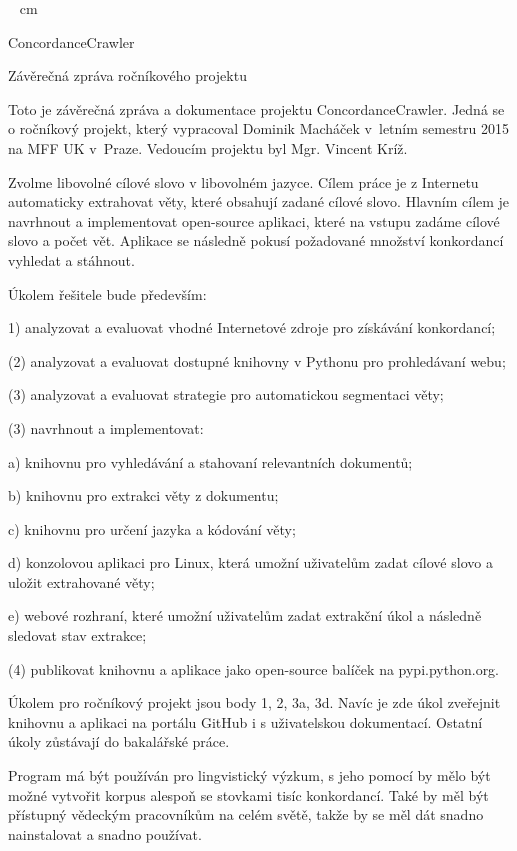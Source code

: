 

~
 cm
\centerline{\nadA ConcordanceCrawler}
\vskip 0.5cm
\centerline{\nadB Závěrečná zpráva ročníkového projektu}
\vskip 1cm

Toto je závěrečná zpráva a dokumentace projektu ConcordanceCrawler. Jedná se o ročníkový
projekt, který vypracoval Dominik Macháček v~letním semestru 2015 na MFF UK
v~Praze. Vedoucím projektu byl Mgr. Vincent Kríž.



Zvolme libovolné cílové slovo v libovolném jazyce. Cílem práce je
z Internetu automaticky extrahovat věty, které obsahují zadané cílové slovo.
Hlavním cílem je navrhnout a implementovat open-source aplikaci, které na
vstupu zadáme cílové slovo a počet vět. Aplikace se následně pokusí
požadované množství konkordancí vyhledat a stáhnout. 

\bigskip

Úkolem řešitele bude především: 

1) analyzovat a evaluovat vhodné Internetové zdroje pro získávání
konkordancí;

(2) analyzovat a evaluovat dostupné knihovny v Pythonu pro prohledávaní
webu;

(3) analyzovat a evaluovat strategie pro automatickou segmentaci věty;

(3) navrhnout a implementovat:

a) knihovnu pro vyhledávání a stahovaní relevantních dokumentů;

b) knihovnu pro extrakci věty z dokumentu;

c) knihovnu pro určení jazyka a kódování věty;

d) konzolovou aplikaci pro Linux, která umožní uživatelům zadat cílové slovo
a uložit extrahované věty;

e) webové rozhraní, které umožní uživatelům zadat extrakční úkol a následně
sledovat stav extrakce;

(4) publikovat knihovnu a aplikace jako open-source balíček na
pypi.python.org.

\bigskip

Úkolem pro ročníkový projekt jsou body 1, 2, 3a, 3d. Navíc je zde úkol
zveřejnit knihovnu a aplikaci na portálu GitHub i s uživatelskou
dokumentací. Ostatní úkoly zůstávají do bakalářské práce.

\bigskip

Program má být používán pro lingvistický výzkum, s jeho pomocí by mělo být
možné vytvořit korpus alespoň se stovkami tisíc konkordancí. Také by měl
být přístupný vědeckým pracovníkům na celém světě, takže by se měl dát
snadno nainstalovat a snadno používat. 


